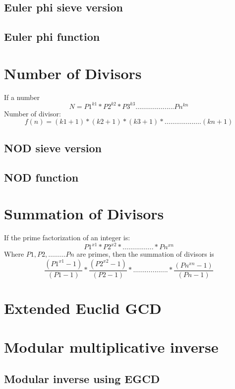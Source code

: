 \documentclass[11pt]{report}
\begin{document}
\subsection{Euler phi sieve version}

\subsection{Euler phi function}

\newpage
\section{Number of Divisors}
If a number $$N= P1^{k1}*P2^{k2}*P3^{k3}………...........Pn^{kn}$$
Number of divisor: $$f(n)=(k1+1)*(k2+1)*(k3+1)*…….........….(kn+1)$$
\subsection{NOD sieve version}

\subsection{NOD function}

\section{Summation of Divisors}
If the prime factorization of an integer is:
		$$P1^{x1}*P2^{x2}*…….....…..*Pn^{xn}$$
Where $P1,P2,………Pn$ are primes, then the summation of divisors is
		$$\frac{(P1^{x1}  -1)}{(P1-1)} * \frac{(P2^{x2}  -1)}{(P2-1)} *………......... *\frac{(Pn^{xn}  -1)}{(Pn-1)}$$
\section{Extended Euclid GCD}

\section{Modular multiplicative inverse}
\subsection{Modular inverse using EGCD}

\end{document}
